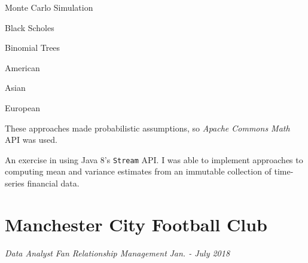 \documentclass[letterpaper,11pt]{article}
\begin{document}
\begin{description}[style=multiline,leftmargin=4cm]
\begin{description}[style=multiline,leftmargin=2.85cm]
		      \item[Options]
		            \begin{itemize*}
			            \item Monte Carlo Simulation
			            \item Black Scholes
			            \item Binomial Trees
		            \end{itemize*}
		      \item[Payoff]
		            \begin{itemize*}
			            \item American
			            \item Asian
			            \item European
		            \end{itemize*}
	      \end{description}
	      These approaches made probabilistic assumptions, so \textit{Apache Commons Math} API was used.

	      \dotfill

	\item[Summarizing financial data \newline \textnormal{\tiny
		      \href{https://adrian.ng/java/yahoofinance/}{adrian.ng/java/yahoofinance/}}]
	      An exercise in using Java 8's \texttt{Stream} API.
	      I was able to implement approaches to computing mean and variance estimates from an immutable collection of time-series financial data.

\end{description}

\newpage
\section{Manchester City Football Club}
\textit{Data Analyst}
\hfill
\textit{Fan Relationship Management}
\hfill
\textit{Jan. - July 2018}
\end{document}
